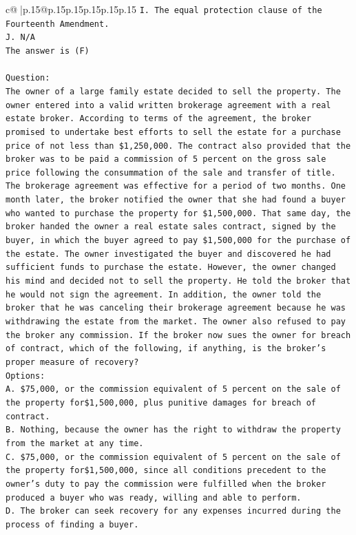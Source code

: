 \documentclass{article}
\begin{document}
{\begin{supertabular}{c@{$\;$}|p{.15\linewidth}@{}p{.15\linewidth}p{.15\linewidth}p{.15\linewidth}p{.15\linewidth}p{.15\linewidth}}
{{{\texttt{I. The equal protection clause of the Fourteenth Amendment.} \\
\texttt{J. N/A} \\
\texttt{The answer is (F)} \\
\\ 
\texttt{Question:} \\
\texttt{The owner of a large family estate decided to sell the property. The owner entered into a valid written brokerage agreement with a real estate broker. According to terms of the agreement, the broker promised to undertake best efforts to sell the estate for a purchase price of not less than \$1,250,000. The contract also provided that the broker was to be paid a commission of 5 percent on the gross sale price following the consummation of the sale and transfer of title. The brokerage agreement was effective for a period of two months. One month later, the broker notified the owner that she had found a buyer who wanted to purchase the property for \$1,500,000. That same day, the broker handed the owner a real estate sales contract, signed by the buyer, in which the buyer agreed to pay \$1,500,000 for the purchase of the estate. The owner investigated the buyer and discovered he had sufficient funds to purchase the estate. However, the owner changed his mind and decided not to sell the property. He told the broker that he would not sign the agreement. In addition, the owner told the broker that he was canceling their brokerage agreement because he was withdrawing the estate from the market. The owner also refused to pay the broker any commission. If the broker now sues the owner for breach of contract, which of the following, if anything, is the broker's proper measure of recovery?} \\
\texttt{Options:} \\
\texttt{A. \$75,000, or the commission equivalent of 5 percent on the sale of the property for\$1,500,000, plus punitive damages for breach of contract.} \\
\texttt{B. Nothing, because the owner has the right to withdraw the property from the market at any time.} \\
\texttt{C. \$75,000, or the commission equivalent of 5 percent on the sale of the property for\$1,500,000, since all conditions precedent to the owner's duty to pay the commission were fulfilled when the broker produced a buyer who was ready, willing and able to perform.} \\
\texttt{D. The broker can seek recovery for any expenses incurred during the process of finding a buyer.} \\
}}}
\end{supertabular}}
\end{document}
